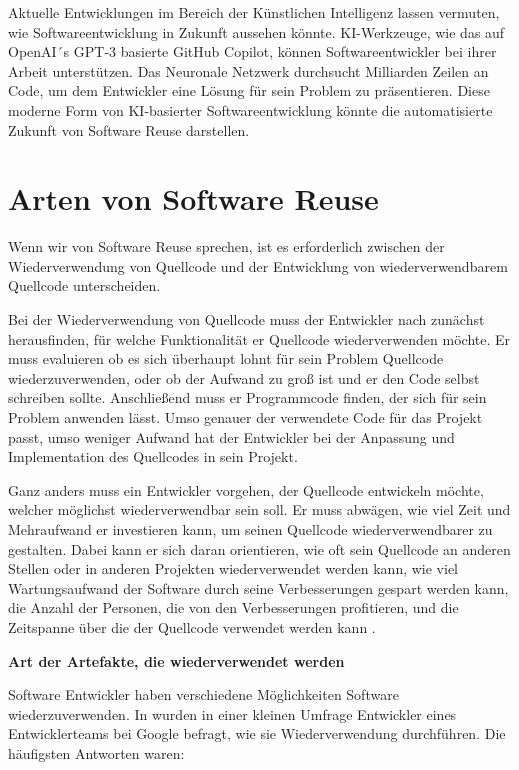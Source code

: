 \documentclass[utf8,biblatex]{lni}
\begin{document}
Aktuelle Entwicklungen im Bereich der Künstlichen Intelligenz lassen vermuten, wie Softwareentwicklung in Zukunft aussehen könnte. KI-Werkzeuge, wie das auf OpenAI´s GPT-3 basierte GitHub Copilot, können Softwareentwickler bei ihrer Arbeit unterstützen. Das Neuronale Netzwerk durchsucht Milliarden Zeilen an Code, um dem Entwickler eine Lösung für sein Problem zu präsentieren. Diese moderne Form von KI-basierter Softwareentwicklung könnte die automatisierte Zukunft von Software Reuse darstellen. 



\section{Arten von Software Reuse}


Wenn wir von Software Reuse sprechen, ist es erforderlich zwischen der Wiederverwendung von Quellcode und der Entwicklung von wiederverwendbarem Quellcode unterscheiden. 

Bei der Wiederverwendung von Quellcode muss der Entwickler nach \citet{Bauer.2016} zunächst herausfinden, für welche Funktionalität er Quellcode wiederverwenden möchte. Er muss evaluieren ob es sich überhaupt lohnt für sein Problem Quellcode wiederzuverwenden, oder ob der Aufwand zu groß ist und er den Code selbst schreiben sollte. Anschließend muss er Programmcode finden, der sich für sein Problem anwenden lässt. Umso genauer der verwendete Code für das Projekt passt, umso weniger Aufwand hat der Entwickler bei der Anpassung und Implementation des Quellcodes in sein Projekt. 

Ganz anders muss ein Entwickler vorgehen, der Quellcode entwickeln möchte, welcher möglichst wiederverwendbar sein soll. Er muss abwägen, wie viel Zeit und Mehraufwand er investieren kann, um seinen Quellcode wiederverwendbarer zu gestalten. Dabei kann er sich daran orientieren, wie oft sein Quellcode an anderen Stellen oder in anderen Projekten wiederverwendet werden kann, wie viel Wartungsaufwand der Software durch seine Verbesserungen gespart werden kann, die Anzahl der Personen, die von den Verbesserungen profitieren, und die Zeitspanne über die der Quellcode verwendet werden kann \citet{Bauer.2016}. 





\textbf{Art der Artefakte, die wiederverwendet werden}


Software Entwickler haben verschiedene Möglichkeiten Software wiederzuverwenden. In \cite{Bauer.2016} wurden in einer kleinen Umfrage Entwickler eines Entwicklerteams bei Google befragt, wie sie Wiederverwendung durchführen. Die häufigsten Antworten waren:
\end{document}
